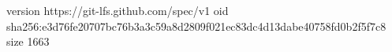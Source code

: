 version https://git-lfs.github.com/spec/v1
oid sha256:e3d76fe20707bc76b3a3c59a8d2809f021ec83dc4d13dabe40758fd0b2f5f7c8
size 1663
